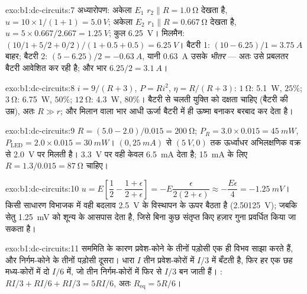 \begin{solution}{exo:b1:dc-circuits:7}
अध्यारोपण: अकेला $E_1$ $r_2 \parallel R = \qty{1.0}{\ohm}$ देखता है,
$u = 10 \times 1/(1 + 1) = \qty{5.0}{V}$; अकेला $E_2$ $r_1 \parallel R
= \qty{0.667}{\ohm}$ देखता है, $u = 5 \times 0.667/2.667 = \qty{1.25}{V}$; कुल
\qty{6.25}{V}। मिलमैन: $(10/1 + 5/2 + 0/2)/(1 + 0.5 + 0.5) = \qty{6.25}{V}$।
बैटरी 1: $(10 - 6.25)/1 = \qty{3.75}{A}$ बाहर; बैटरी 2: $(5 - 6.25)/2
= \qty{-0.63}{A}$, यानी \qty{0.63}{A} उसके \emph{भीतर} --- अतः उसे
प्रबलतर बैटरी आवेशित कर रही है; और भार $6.25/2 = \qty{3.1}{A}$।
\end{solution}

\begin{solution}{exo:b1:dc-circuits:8}
$i = 9/(R + 3)$, $P = Ri^2$, $\eta = R/(R + 3)$: $\qty{1}{\ohm}$:
\qty{5.1}{W}, $25\%$; $\qty{3}{\ohm}$: \qty{6.75}{W}, $50\%$;
$\qty{12}{\ohm}$: \qty{4.3}{W}, $80\%$। बैटरी से चलती युक्ति को
दक्षता चाहिए (बैटरी की उम्र), अतः $R \gg r$; और मिलान वाला भार आधी ऊर्जा
बैटरी में ही ऊष्मा बनाकर बरबाद कर देता है।
\end{solution}

\begin{solution}{exo:b1:dc-circuits:9}
$R = (5.0 - 2.0)/0.015 = \qty{200}{\ohm}$; $P_R = 3.0 \times 0.015 =
\qty{45}{mW}$, $P_{\mathrm{LED}} = 2.0 \times 0.015 = \qty{30}{mW}$।  $(0, \qty{25}{mA})$ से $(\qty{5}{V}, 0)$ तक ऊर्ध्वाधर
अभिलक्षणिक वक्र से \qty{2.0}{V} पर मिलती है। \qty{3.3}{V} पर वही 
केवल \qty{6.5}{mA} देता है; \qty{15}{mA} के लिए $R = 1.3/0.015 =
\qty{87}{\ohm}$ चाहिए।
\end{solution}

\begin{solution}{exo:b1:dc-circuits:10}
$u = E\left[\dfrac12 - \dfrac{1 + \epsilon}{2 + \epsilon}\right] =
-E\dfrac{\epsilon}{2(2 + \epsilon)} \approx -\dfrac{E\epsilon}{4} =
\qty{-1.25}{mV}$। किसी साधारण विभाजक में वही बदलाव
\qty{2.5}{V} के विस्थापन के ऊपर बैठता है (\qty{2.50125}{V}); जबकि सेतु
\qty{1.25}{mV} को शून्य के आसपास देता है, जिसे बिना कुछ संतृप्त किए हज़ार गुना
प्रवर्धित किया जा सकता है।
\end{solution}

\begin{solution}{exo:b1:dc-circuits:11}
सममिति के कारण प्रवेश-कोने के तीनों पड़ोसी एक ही विभव साझा करते हैं, और
निर्गम-कोने के तीनों पड़ोसी दूसरा। धारा
$I$ तीन प्रवेश-कोरों में $I/3$ में बँटती है, फिर हर एक छह मध्य-कोरों में दो
$I/6$ में, जो तीन निर्गम-कोरों में फिर से $I/3$ बन जाती हैं। :
$RI/3 + RI/6 + RI/3 = 5RI/6$, अतः
$R_{\mathrm{eq}} = 5R/6$।
\end{solution}


